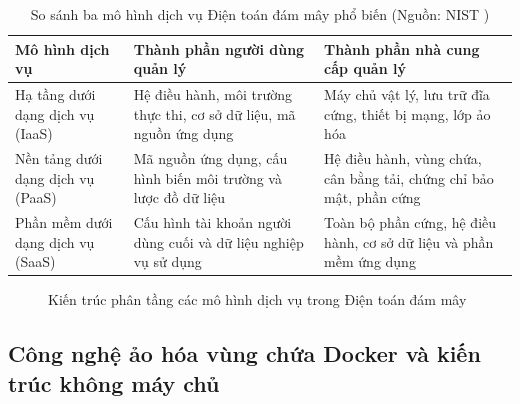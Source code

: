 \begin{table}[H]
\caption{So sánh ba mô hình dịch vụ Điện toán đám mây phổ biến (Nguồn: NIST \cite{mell2011nist})}
\label{tab:cloud_service_models}
\centering
\begin{tabular}{|p{2.8cm}|p{5.5cm}|p{5.7cm}|}
\hline
\textbf{Mô hình dịch vụ} & \textbf{Thành phần người dùng quản lý} & \textbf{Thành phần nhà cung cấp quản lý} \\
\hline
Hạ tầng dưới dạng dịch vụ (IaaS) & Hệ điều hành, môi trường thực thi, cơ sở dữ liệu, mã nguồn ứng dụng & Máy chủ vật lý, lưu trữ đĩa cứng, thiết bị mạng, lớp ảo hóa \\
\hline
Nền tảng dưới dạng dịch vụ (PaaS) & Mã nguồn ứng dụng, cấu hình biến môi trường và lược đồ dữ liệu & Hệ điều hành, vùng chứa, cân bằng tải, chứng chỉ bảo mật, phần cứng \\
\hline
Phần mềm dưới dạng dịch vụ (SaaS) & Cấu hình tài khoản người dùng cuối và dữ liệu nghiệp vụ sử dụng & Toàn bộ phần cứng, hệ điều hành, cơ sở dữ liệu và phần mềm ứng dụng \\
\hline
\end{tabular}
\end{table}

\begin{figure}[H]
\centering
{}
\caption{Kiến trúc phân tầng các mô hình dịch vụ trong Điện toán đám mây}
\label{fig:cloud_models}
\end{figure}

\subsection{Công nghệ ảo hóa vùng chứa Docker và kiến trúc không máy chủ}

